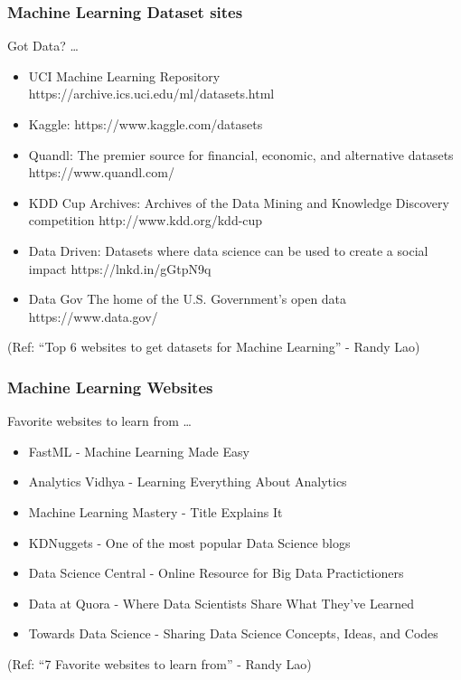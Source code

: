 \begin{frame}\frametitle{Machine Learning Dataset sites}
Got Data? \ldots

\footnotesize
\begin{itemize}
\item UCI Machine Learning Repository
https://archive.ics.uci.edu/ml/datasets.html

\item Kaggle: 
https://www.kaggle.com/datasets

\item Quandl: The premier source for financial, economic, and alternative datasets
https://www.quandl.com/

\item KDD Cup Archives: Archives of the Data Mining and Knowledge Discovery competition
http://www.kdd.org/kdd-cup

\item Data Driven: Datasets where data science can be used to create a social impact
https://lnkd.in/gGtpN9q

\item Data Gov 
The home of the U.S. Government’s open data
https://www.data.gov/
\end{itemize}

(Ref: ``Top 6 websites to get datasets for Machine Learning'' - Randy Lao)
\end{frame}

\begin{frame}\frametitle{Machine Learning Websites}
Favorite websites to learn from \ldots

\footnotesize
\begin{itemize}
\item FastML - Machine Learning Made Easy
\item Analytics Vidhya - Learning Everything About Analytics
\item Machine Learning Mastery - Title Explains It
\item KDNuggets - One of the most popular Data Science blogs
\item Data Science Central - Online Resource for Big Data Practictioners
\item Data at Quora - Where Data Scientists Share What They've Learned
\item Towards Data Science - Sharing Data Science Concepts, Ideas, and Codes
\end{itemize}

(Ref: ``7 Favorite websites to learn from'' - Randy Lao)
\end{frame}

